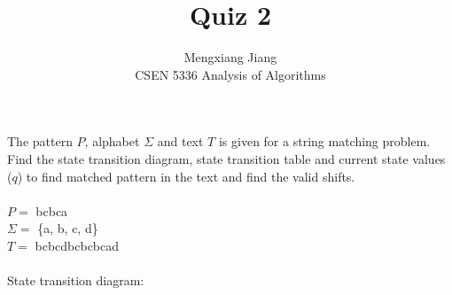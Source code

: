 \documentclass[12pt]{article}
\newenvironment{problem}[2][Problem]{\begin{trivlist}
\item[\hskip \labelsep {\bfseries #1}\hskip \labelsep {\bfseries #2.}]}{\end{trivlist}}
\begin{document}
 
 
\title{Quiz 2}%
\author{Mengxiang Jiang\\ %
CSEN 5336 Analysis of Algorithms} %
 
\maketitle
 
\begin{problem}{1} %
    The pattern $P$, alphabet $\Sigma$ and text $T$ is given for a string matching problem. Find the
state transition diagram, state transition table and current state values ($q$) to find
matched pattern in the text and find the valid shifts.\\\\
$P=$ bcbca\\
$\Sigma =$ \{a, b, c, d\}\\
$T=$ bcbcdbcbcbcad\\\\
State transition diagram:\\
\end{problem}
\end{document}
